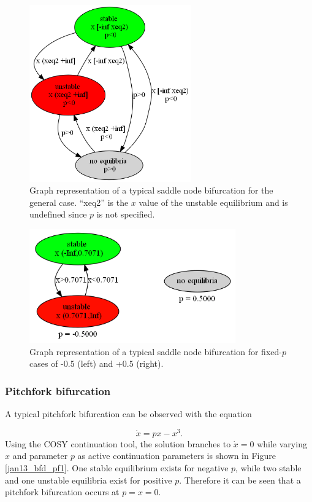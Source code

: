 \documentclass[12pt]{article}
\begin{document}
\begin{figure}[H]
\begin{center}
\includegraphics[width=2.75in]{jan13_graph_sn1.png}
\caption{Graph representation of a typical saddle node bifurcation for the general case. ``xeq2'' is the $x$ value of the unstable equilibrium and is undefined since $p$ is not specified.}
\label{jan13_graph_sn1}
\end{center}
\end{figure}

\begin{figure}[H]
\begin{center}
\includegraphics[width=3.5in]{jan13_graph_sn2.png}
\caption{Graph representation of a typical saddle node bifurcation for fixed-$p$ cases of -0.5 (left) and +0.5 (right).}
\label{jan13_graph_sn2}
\end{center}
\end{figure}

\subsubsection{Pitchfork bifurcation}
A typical pitchfork bifurcation can be observed with the equation

\begin{equation}
\dot{x}=px-x^3.
\end{equation}
Using the COSY continuation tool, the solution branches to $\dot{x}=0$ while varying $x$ and parameter $p$ as active continuation parameters is shown in Figure \ref{jan13_bfd_pf1}. One stable equilibrium exists for negative $p$, while two stable and one unstable equilibria exist for positive $p$. Therefore it can be seen that a pitchfork bifurcation occurs at $p=x=0$.
\end{document}
